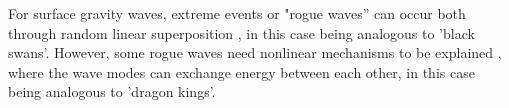 For surface gravity waves, extreme events or "rogue waves'' can occur both through random linear superposition \citep{Fedele2016},  in this case being analogous to 'black swans'.
However, some rogue waves need nonlinear mechanisms to be explained \citep{Onorato2021,2013PhR...528...47O}, where the wave modes can exchange energy between each other, in this case being analogous to 'dragon kings'. %
%
%
%


